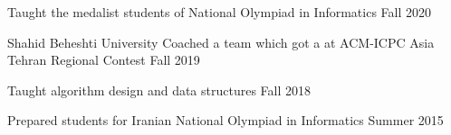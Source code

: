 \begin{cvtas}

  \cvta
    {} %
    {Taught the medalist students of National Olympiad in Informatics} %
    {Fall 2020} %
    {} %

  \cvta
    {Shahid Beheshti University} %
    {Coached a team which got a  at ACM-ICPC Asia Tehran Regional Contest}
    {Fall 2019} %
    {} %

  \cvta
    {} %
    {Taught algorithm design and data structures}
    {Fall 2018} %
    {} %





  \cvta
    {} %
    {Prepared students for Iranian National Olympiad in Informatics} %
    {Summer 2015} %
    {} %

\end{cvtas}